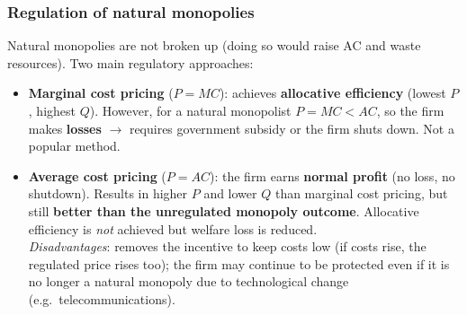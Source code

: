 \subsubsection*{Regulation of natural monopolies}
Natural monopolies are not broken up (doing so would raise AC and waste resources). Two main regulatory approaches:
\begin{itemize}
  \item \textbf{Marginal cost pricing} ($P = MC$): achieves \textbf{allocative efficiency} (lowest $P$, highest $Q$). However, for a natural monopolist $P = MC < AC$, so the firm makes \textbf{losses} $\to$ requires government subsidy or the firm shuts down. Not a popular method.
  \item \textbf{Average cost pricing} ($P = AC$): the firm earns \textbf{normal profit} (no loss, no shutdown). Results in higher $P$ and lower $Q$ than marginal cost pricing, but still \textbf{better than the unregulated monopoly outcome}. Allocative efficiency is \textit{not} achieved but welfare loss is reduced.\\
  \textit{Disadvantages}: removes the incentive to keep costs low (if costs rise, the regulated price rises too); the firm may continue to be protected even if it is no longer a natural monopoly due to technological change (e.g.\ telecommunications).
\end{itemize}
